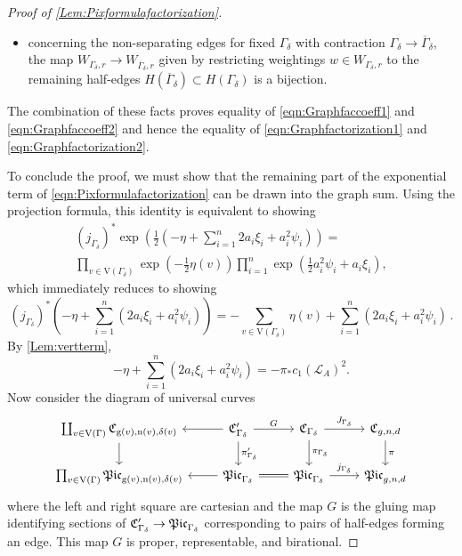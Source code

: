 \documentclass[a4paper,12pt]{article} %
\def\n{\mathrm{n}}
\def\V{\mathrm{V}}
\def\g{\mathrm{g}}
\theoremstyle{definition}
\theoremstyle{plain}%
\newcommand{\Picabs}{\mathfrak{Pic}}
\begin{document}
\begin{proof}[Proof of \cref{Lem:Pixformulafactorization}]
\begin{itemize}
    \item concerning the non-separating edges for fixed $\Gamma_\delta$ with contraction $\Gamma_\delta \to \overline{\Gamma}_\delta$, the map $W_{\Gamma_\delta,r} \to W_{\overline{\Gamma}_\delta,r}$ given by restricting weightings $w \in W_{\Gamma_\delta,r}$ to the remaining half-edges $H(\overline{\Gamma}_\delta) \subset H({\Gamma}_\delta)$ is a bijection.
\end{itemize}
The combination of these facts proves equality of \eqref{eqn:Graphfaccoeff1} and \eqref{eqn:Graphfaccoeff2} and hence the equality of \eqref{eqn:Graphfactorization1} and \eqref{eqn:Graphfactorization2}. 

To conclude the proof, we must show that the remaining part of the exponential term of \eqref{eqn:Pixformulafactorization} can be drawn into the graph sum. Using the projection formula, this identity is equivalent to showing
\begin{multline*}
(j_{\Gamma_\delta})^* \exp \left( \frac{1}{2} \left(-\eta + \sum_{i=1}^n 2 a_i \xi_i+ a_i^2 \psi_i \right) \right) = \\ \prod_{v \in \V(\Gamma_\delta)} \exp\left(-\frac12 \eta(v) \right) \prod_{i=1}^n \exp\left(\frac12 a_i^2 \psi_i + a_i \xi_i \right)
,
\end{multline*}
which immediately reduces to showing
\[(j_{\Gamma_\delta})^*  \left(-\eta + \sum_{i=1}^n (2 a_i \xi_i+ a_i^2 \psi_i) \right) = -\sum_{v \in \V(\Gamma_\delta)} \eta(v) + \sum_{i=1}^n (2 a_i \xi_i + a_i^2 \psi_i) 
\, .\]
By \cref{Lem:vertterm},
    \[-\eta + \sum_{i=1}^n (2 a_i \xi_i+ a_i^2 \psi_i) = - \pi_* c_1(\mathcal{L}_A)^2.\]
Now consider the diagram of universal curves
\[
\begin{tikzcd}
\coprod_{v \in \V(\Gamma)}\frak C_{\g(v),\n(v),\delta(v)}  \arrow[d] &\frak C'_{\Gamma_{\delta}} \arrow[l] \arrow[r,"G"] \arrow[d,"\pi'_{\Gamma_\delta}"] &\frak C_{\Gamma_{\delta}} \arrow[r, "J_{\Gamma_{\delta}}"] \arrow[d,"\pi_{\Gamma_\delta}"] & \frak C_{g,n,d} \arrow[d, "\pi"]\\
\prod_{v \in \V(\Gamma)}\Picabs_{\g(v),\n(v),\delta(v)} & \Picabs_{\Gamma_{\delta}}\arrow[l]&\Picabs_{\Gamma_{\delta}} \ar[equal]{l}\arrow[r, "j_{\Gamma_{\delta}}"] & \Picabs_{g,n,d}
\end{tikzcd}    
\]
where the left and right square are cartesian and the map $G$ is the gluing map identifying sections of $\frak C'_{\Gamma_{\delta}} \to \Picabs_{\Gamma_\delta}$ corresponding to pairs of half-edges forming an edge. This map $G$ is proper, representable, and birational. 


\end{proof}
\end{document}

